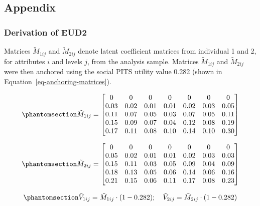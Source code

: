 \documentclass[
  letterpaper,
  DIV=11,
  numbers=noendperiod]{scrartcl}
\begin{document}
\begin{longtable}[]{@{}llll@{}}
\end{longtable}

\subsection{Appendix}\label{appendix}

\subsubsection{Derivation of EUD2}\label{sec-appendix1}

Matrices \(\tilde{M}_{1ij}\) and \(\tilde{M}_{2ij}\) denote latent
coefficient matrices from individual 1 and 2, for attributes \(i\) and
levels \(j\), from the analysis sample. Matrices \(\tilde{M}_{1ij}\) and
\(\tilde{M}_{2ij}\) were then anchored using the social PITS utility
value 0.282 (shown in Equation~\ref{eq-anchoring-matrices}).

\begin{equation}\phantomsection\label{eq-coef-1}{
\tilde{M}_{1ij} =  
\begin{bmatrix}
0 & 0 & 0 & 0 & 0 & 0 & 0 \\
0.03 & 0.02 & 0.01 & 0.01 & 0.02 & 0.03 & 0.05 \\
0.11 & 0.07 & 0.05 & 0.03 & 0.07 & 0.05 & 0.11 \\
0.15 & 0.09 & 0.07 & 0.04 & 0.12 & 0.08 & 0.19 \\
0.17 & 0.11 & 0.08 & 0.10 & 0.14 & 0.10 & 0.30
\end{bmatrix}
}\end{equation}

\begin{equation}\phantomsection\label{eq-coef-2}{
\tilde{M}_{2ij} =  
\begin{bmatrix}
0 & 0 & 0 & 0 & 0 & 0 & 0 \\
0.05 & 0.02 & 0.01 & 0.01 & 0.02 & 0.03 & 0.03 \\
0.15 & 0.11 & 0.03 & 0.05 & 0.09 & 0.04 & 0.09 \\
0.18 & 0.13 & 0.05 & 0.06 & 0.14 & 0.06 & 0.16 \\
0.21 & 0.15 & 0.06 & 0.11 & 0.17 & 0.08 & 0.23
\end{bmatrix}
}\end{equation}

\begin{equation}\phantomsection\label{eq-anchoring-matrices}{
    \tilde{V}_{1ij} = \tilde{M}_{1ij} \cdot (1-0.282); \quad
    \tilde{V}_{2ij} = \tilde{M}_{2ij} \cdot (1-0.282)
}\end{equation}
\end{document}
